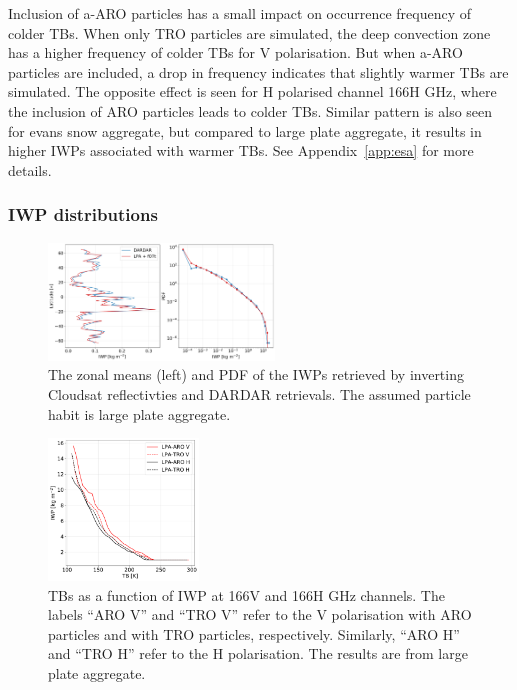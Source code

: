 \documentclass[amt, manuscript]{copernicus}
\begin{document}
Inclusion of a-ARO particles has a small impact on occurrence frequency of colder TBs. When only TRO particles are simulated, the deep convection zone has a higher frequency of colder TBs for V polarisation. But when a-ARO particles are included, a drop in frequency indicates that slightly warmer TBs are simulated. The opposite effect is seen for H polarised channel 166H\,\,GHz, where the inclusion of ARO particles leads to colder TBs. Similar pattern is also seen for evans snow aggregate, but compared to large plate aggregate, it results in higher IWPs associated with warmer TBs. See Appendix~\ref{app:esa} for more details.



\subsubsection{IWP distributions}
%
\begin{figure}[t]
	\includegraphics[width=6cm]{Figures/PDF_IWP_DARDAR.pdf}
	\caption{The zonal means (left) and  PDF of  the IWPs retrieved by inverting Cloudsat reflectivties and  DARDAR retrievals. The assumed particle habit is large plate aggregate.}
	\label{fig:IWP_DARDAR}
\end{figure}
\begin{figure}[t]
	\includegraphics[width=4cm]{Figures/TB_IWP.pdf}
	\caption{TBs as a function of IWP at 166V and 166H\,\,GHz channels. The labels ``ARO V'' and ``TRO V'' refer to the V polarisation with ARO particles and with TRO particles, respectively. Similarly, ``ARO H'' and ``TRO H'' refer to the H polarisation. The results are from large plate aggregate.}
	\label{fig:TB_IWP}
\end{figure}
\end{document}
